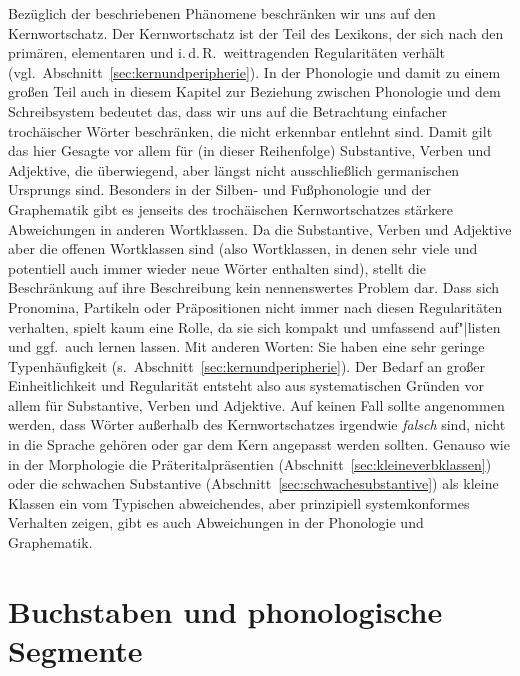 Bezüglich der beschriebenen Phänomene beschränken wir uns auf den Kernwortschatz.
Der Kernwortschatz ist der Teil des Lexikons, der sich nach den primären, elementaren und i.\,d.\,R.\ weittragenden Regularitäten verhält (vgl.\ Abschnitt~\ref{sec:kernundperipherie}).
In der Phonologie und damit zu einem großen Teil auch in diesem Kapitel zur Beziehung zwischen Phonologie und dem Schreibsystem bedeutet das, dass wir uns auf die Betrachtung einfacher trochäischer Wörter beschränken, die nicht erkennbar entlehnt sind.
Damit gilt das hier Gesagte vor allem für (in dieser Reihenfolge) Substantive, Verben und Adjektive, die überwiegend, aber längst nicht ausschließlich germanischen Ursprungs sind.
Besonders in der Silben- und Fußphonologie und der Graphematik gibt es jenseits des trochäischen Kernwortschatzes stärkere Abweichungen in anderen Wortklassen.
Da die Substantive, Verben und Adjektive aber die offenen Wortklassen sind (also Wortklassen, in denen sehr viele und potentiell auch immer wieder neue Wörter enthalten sind), stellt die Beschränkung auf ihre Beschreibung kein nennenswertes Problem dar.
Dass sich Pronomina, Partikeln oder Präpositionen nicht immer nach diesen Regularitäten verhalten, spielt kaum eine Rolle, da sie sich kompakt und umfassend auf"|listen und ggf.\ auch lernen lassen.
Mit anderen Worten:
Sie haben eine sehr geringe Typenhäufigkeit (s.\ Abschnitt~\ref{sec:kernundperipherie}).
Der Bedarf an großer Einheitlichkeit und Regularität entsteht also aus systematischen Gründen vor allem für Substantive, Verben und Adjektive.
Auf keinen Fall sollte angenommen werden, dass Wörter außerhalb des Kernwortschatzes irgendwie \textit{falsch} sind, nicht in die Sprache gehören oder gar dem Kern angepasst werden sollten.
Genauso wie in der Morphologie die Präteritalpräsentien (Abschnitt~\ref{sec:kleineverbklassen}) oder die schwachen Substantive (Abschnitt~\ref{sec:schwachesubstantive}) als kleine Klassen ein vom Typischen abweichendes, aber prinzipiell systemkonformes Verhalten zeigen, gibt es auch Abweichungen in der Phonologie und Graphematik.




\section{Buchstaben und phonologische Segmente}
\label{sec:buchstabenundphonologischesegmente}

